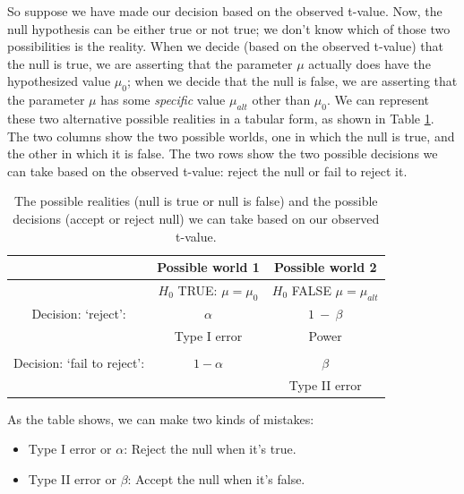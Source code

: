 \documentclass[12pt,]{krantz}
\providecommand{\tightlist}{%
  \setlength{\itemsep}{0pt}\setlength{\parskip}{0pt}}
\begin{document}
So suppose we have made our decision based on the observed t-value. Now, the null hypothesis can be either true or not true; we don't know which of those two possibilities is the reality.
When we decide (based on the observed t-value) that the null is true, we are asserting that the parameter \(\mu\) actually does have the hypothesized value \(\mu_0\); when we decide that the null is false, we are asserting that the parameter \(\mu\) has some \emph{specific} value \(\mu_{alt}\) other than \(\mu_0\).
We can represent these two alternative possible realities in a tabular form, as shown in Table \ref{tab:type12}. The two columns show the two possible worlds, one in which the null is true, and the other in which it is false. The two rows show the two possible decisions we can take based on the observed t-value: reject the null or fail to reject it.

\begin{table}
\begin{tabular}{ccc}
        & \textbf{Possible world 1}      & \textbf{Possible world 2} \\  
\hline
 & $H_0$ TRUE: $\mu=\mu_0$  & $H_0$ FALSE $\mu=\mu_{alt}$ \\
\hline
Decision: `reject': & $\alpha$ & $1~-~\beta$ \\
                                     & Type I error                         & Power \\                                      
                                     & & \\
\hline
Decision: `fail to reject': & $1 - \alpha$ & $\beta$ \\                                    &                                 & Type II error\\
\hline
\end{tabular}
\caption{The possible realities (null is true or null is false) and the possible decisions (accept or reject null) we can take based on our observed t-value.} \label{tab:type12}
\end{table}

As the table shows, we can make two kinds of mistakes:

\begin{itemize}
\tightlist
\item
  Type I error or \(\alpha\): Reject the null when it's true.
\item
  Type II error or \(\beta\): Accept the null when it's false.
\end{itemize}
\end{document}
